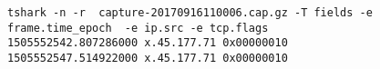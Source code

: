 
\begin{lstlisting}
tshark -n -r  capture-20170916110006.cap.gz -T fields -e frame.time_epoch  -e ip.src -e tcp.flags
1505552542.807286000 x.45.177.71 0x00000010
1505552547.514922000 x.45.177.71 0x00000010
\end{lstlisting}
